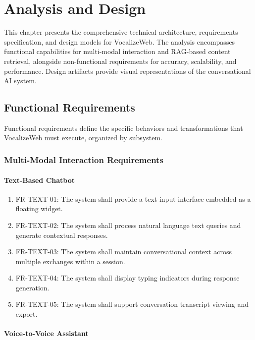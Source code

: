 \chapter{Analysis and Design}

This chapter presents the comprehensive technical architecture, requirements specification, and design models for VocalizeWeb. The analysis encompasses functional capabilities for multi-modal interaction and RAG-based content retrieval, alongside non-functional requirements for accuracy, scalability, and performance. Design artifacts provide visual representations of the conversational AI system.

\section{Functional Requirements}

Functional requirements define the specific behaviors and transformations that VocalizeWeb must execute, organized by subsystem.

\subsection{Multi-Modal Interaction Requirements}

\subsubsection{Text-Based Chatbot}

\begin{enumerate}[leftmargin=*]
    \item FR-TEXT-01: The system shall provide a text input interface embedded as a floating widget.
    \item FR-TEXT-02: The system shall process natural language text queries and generate contextual responses.
    \item FR-TEXT-03: The system shall maintain conversational context across multiple exchanges within a session.
    \item FR-TEXT-04: The system shall display typing indicators during response generation.
    \item FR-TEXT-05: The system shall support conversation transcript viewing and export.
\end{enumerate}

\subsubsection{Voice-to-Voice Assistant}

